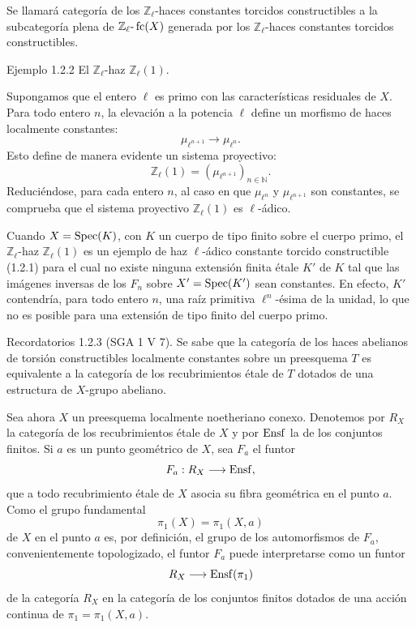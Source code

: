 Se llamará categoría de los \(\mathbb Z_\ell\)-haces constantes torcidos constructibles a la subcategoría plena de \(\mathbb Z_\ell\text{-}\operatorname{fc}(X)\) generada por los \(\mathbb Z_\ell\)-haces constantes torcidos constructibles.

\begin{statement}{Ejemplo 1.2.2}
El \(\mathbb Z_\ell\)-haz \(\mathbb Z_\ell(1)\).
\end{statement}

Supongamos que el entero \(\ell\) es primo con las características residuales de \(X\). Para todo entero \(n\), la elevación a la potencia \(\ell\) define un morfismo de haces localmente constantes:
\[
\mu_{\ell^{n+1}}\longrightarrow \mu_{\ell^n}.
\]
Esto define de manera evidente un sistema proyectivo:
\[
\mathbb Z_\ell(1)=(\mu_{\ell^{n+1}})_{n\in\mathbb N}.
\]
Reduciéndose, para cada entero \(n\), al caso en que \(\mu_{\ell^n}\) y \(\mu_{\ell^{n+1}}\) son constantes, se comprueba que el sistema proyectivo \(\mathbb Z_\ell(1)\) es \(\ell\)-ádico.

Cuando \(X=\operatorname{Spec}(K)\), con \(K\) un cuerpo de tipo finito sobre el cuerpo primo, el \(\mathbb Z_\ell\)-haz \(\mathbb Z_\ell(1)\) es un ejemplo de haz \(\ell\)-ádico constante torcido constructible (1.2.1) para el cual no existe ninguna extensión finita étale \(K'\) de \(K\) tal que las imágenes inversas de los \(F_n\) sobre \(X'=\operatorname{Spec}(K')\) sean constantes. En efecto, \(K'\) contendría, para todo entero \(n\), una raíz primitiva \(\ell^n\)-ésima de la unidad, lo que no es posible para una extensión de tipo finito del cuerpo primo.

\begin{statement}{Recordatorios 1.2.3}
(SGA 1 V 7). Se sabe que la categoría de los haces abelianos de torsión constructibles localmente constantes sobre un preesquema \(T\) es equivalente a la categoría de los recubrimientos étale de \(T\) dotados de una estructura de \(X\)-grupo abeliano.
\end{statement}

Sea ahora \(X\) un preesquema localmente noetheriano conexo. Denotemos por \(R_X\) la categoría de los recubrimientos étale de \(X\) y por \(\operatorname{Ensf}\) la de los conjuntos finitos. Si \(a\) es un punto geométrico de \(X\), sea \(F_a\) el funtor
\[
F_a:R_X\longrightarrow \operatorname{Ensf},
\]
que a todo recubrimiento étale de \(X\) asocia su fibra geométrica en el punto \(a\). Como el grupo fundamental
\[
\pi_1(X)=\pi_1(X,a)
\]
de \(X\) en el punto \(a\) es, por definición, el grupo de los automorfismos de \(F_a\), convenientemente topologizado, el funtor \(F_a\) puede interpretarse como un funtor
\[
R_X\longrightarrow \operatorname{Ensf}(\pi_1)
\]
de la categoría \(R_X\) en la categoría de los conjuntos finitos dotados de una acción continua de \(\pi_1=\pi_1(X,a)\).

